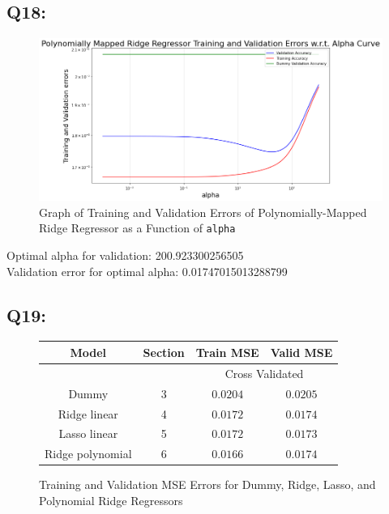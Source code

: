 \documentclass{article}
\newcommand{\code}[1]{\texttt{#1}}
\begin{document}
\subsection*{Q18:}
    \begin{figure}[H]
        \centering
        \includegraphics[scale=0.5]{q18.png}
        \caption{Graph of Training and Validation Errors of Polynomially-Mapped Ridge Regressor as a Function of \code{alpha}}
        \label{fig:q8}
    \end{figure}
    Optimal alpha for validation: 200.923300256505\\
    Validation error for optimal alpha: 0.01747015013288799

\subsection*{Q19:}
    \begin{figure}[H]
        \centering
        \begin{tabular}{|c|c|c|c|}
            \hline
            \rowcolor{gray!60}
            Model & Section & Train MSE & Valid MSE\\ \hline
            \rowcolor{gray!20}
            ~&~ & \multicolumn{2}{c|}{Cross Validated}\\ \hline
            Dummy & 3 & $0.0204$ & $0.0205$\\ \hline
            Ridge linear & 4 & $0.0172$ & $0.0174$\\ \hline
            Lasso linear & 5 & $0.0172$ & $0.0173$\\ \hline
            Ridge polynomial & 6 & $0.0166$ & $0.0174$\\ \hline
        \end{tabular}
        \caption{Training and Validation MSE Errors for Dummy, Ridge, Lasso, and Polynomial Ridge Regressors}
    \end{figure}
\end{document}

